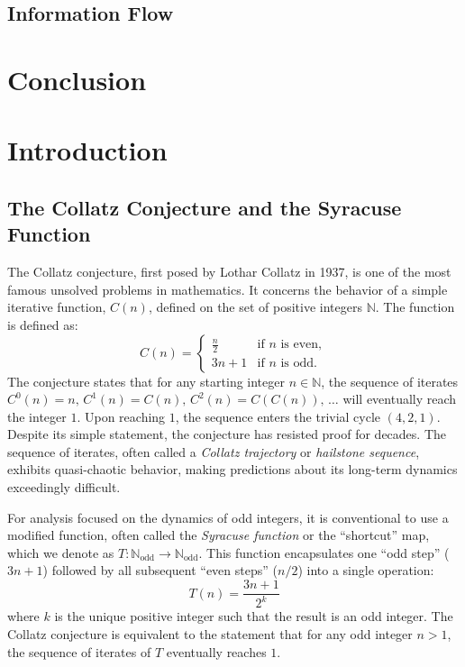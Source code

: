 \documentclass[12pt]{article}
\theoremstyle{plain}
\theoremstyle{definition}
\begin{document}
    

    \subsection{Information Flow}

\section{Conclusion}


\section{Introduction}
\subsection{The Collatz Conjecture and the Syracuse Function}

The Collatz conjecture, first posed by Lothar Collatz in 1937, is one of the most famous unsolved problems in mathematics. It concerns the behavior of a simple iterative function, $C(n)$, defined on the set of positive integers $\mathbb{N}$. The function is defined as:
\[
C(n) = 
\begin{cases}
\frac{n}{2} & \text{if } n \text{ is even}, \\
3n+1        & \text{if } n \text{ is odd}.
\end{cases}
\]
The conjecture states that for any starting integer $n \in \mathbb{N}$, the sequence of iterates $C^0(n) = n,\, C^1(n) = C(n),\, C^2(n) = C(C(n)),\, \ldots$ will eventually reach the integer $1$. Upon reaching $1$, the sequence enters the trivial cycle $(4, 2, 1)$. Despite its simple statement, the conjecture has resisted proof for decades. The sequence of iterates, often called a \emph{Collatz trajectory} or \emph{hailstone sequence}, exhibits quasi-chaotic behavior, making predictions about its long-term dynamics exceedingly difficult.

For analysis focused on the dynamics of odd integers, it is conventional to use a modified function, often called the \emph{Syracuse function} or the ``shortcut'' map, which we denote as $T\colon \mathbb{N}_{\text{odd}} \to \mathbb{N}_{\text{odd}}$. This function encapsulates one ``odd step'' ($3n+1$) followed by all subsequent ``even steps'' ($n/2$) into a single operation:
\[
T(n) = \frac{3n+1}{2^k}
\]
where $k$ is the unique positive integer such that the result is an odd integer. The Collatz conjecture is equivalent to the statement that for any odd integer $n > 1$, the sequence of iterates of $T$ eventually reaches $1$.
\end{document}
